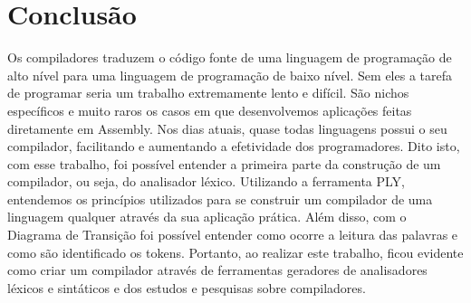 \documentclass[
	12pt,				%
	openright,			%
	twoside,			%
	a4paper,			%
	english,			%
	french,				%
	spanish,			%
	brazil				%
	]{abntex2}
\begin{document}
\chapter*[Conclusão]{Conclusão}
Os compiladores traduzem o código fonte de uma linguagem de programação
de alto nível para uma linguagem de programação de baixo nível. Sem eles 
a tarefa de programar seria um trabalho extremamente lento e difícil.
São nichos específicos e muito raros os casos em que desenvolvemos
aplicações feitas diretamente em Assembly. Nos dias atuais, quase todas linguagens
possui o seu compilador, facilitando e aumentando a efetividade dos programadores.
Dito isto, com esse trabalho, foi possível entender a primeira parte da construção
de um compilador, ou seja, do analisador léxico. Utilizando a ferramenta PLY,
entendemos os princípios utilizados para se construir um compilador de uma
linguagem qualquer através da sua aplicação prática. Além disso, com o Diagrama
de Transição foi possível entender como ocorre a leitura das palavras e como são
identificado os tokens. Portanto, ao realizar este trabalho,
ficou evidente como criar um compilador através de ferramentas geradores de 
analisadores léxicos e sintáticos e dos estudos e pesquisas sobre compiladores.


\postextual



%
%

\printindex
\end{document}
